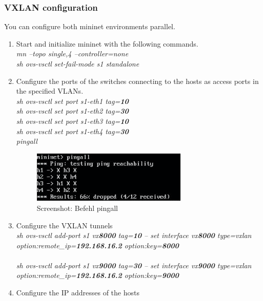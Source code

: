 \documentclass[a4,12pt]{scrartcl}
\begin{document}
\subsubsection{VXLAN configuration}
You can configure both mininet environments parallel.
\begin{enumerate}
\item Start and initialize mininet with the following commands. \\
\textit{mn --topo single,4 --controller=none} \\
\textit{sh ovs-vsctl set-fail-mode s1 standalone}
\item Configure the ports of the switches connecting to the hosts as access ports in the specified VLANs. \\
\textit{sh ovs-vsctl set port s1-eth1 tag=\textbf{10}}\\
\textit{sh ovs-vsctl set port s1-eth2 tag=\textbf{30}}\\
\textit{sh ovs-vsctl set port s1-eth3 tag=\textbf{10}}\\
\textit{sh ovs-vsctl set port s1-eth4 tag=\textbf{30}}\\
\textit{pingall} \\
\begin{figure} [H]
	\begin{center}
	\includegraphics[width=0.70\textwidth]{./pictures/pingall.png}
	\caption{Screenshot: Befehl pingall}
	\label{x}
	\end{center}
\end{figure}
\item Configure the VXLAN tunnels\\
\textit{sh ovs-vsctl add-port s1 vx\textbf{8000}  tag=\textbf{10} -- set interface vx\textbf{8000} type=vxlan\\ option:remote\_ip=\textbf{192.168.16.2} option:key=\textbf{8000}}\\
\\
\textit{sh ovs-vsctl add-port s1 vx\textbf{9000}  tag=\textbf{30} -- set interface vx\textbf{9000} type=vxlan\\ option:remote\_ip=\textbf{192.168.16.2} option:key=\textbf{9000}}\\
\item Configure the IP addresses of the hosts\\

\end{enumerate}
\end{document}
